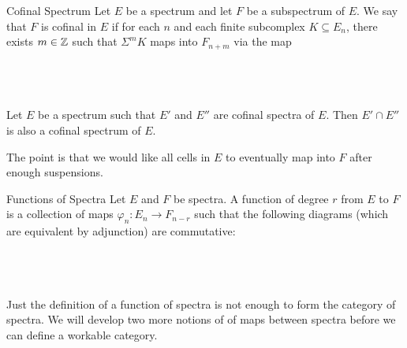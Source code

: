 \documentclass[a4paper]{article}
\begin{document}
\begin{defn}{Cofinal Spectrum}{} Let $E$ be a spectrum and let $F$ be a subspectrum of $E$. We say that $F$ is cofinal in $E$ if for each $n$ and each finite subcomplex $K\subseteq E_n$, there exists $m\in\mathbb{Z}$ such that $\Sigma^m K$ maps into $F_{n+m}$ via the map \\~\\
\\~\\
\end{defn}

\begin{lmm}{}{} Let $E$ be a spectrum such that $E'$ and $E''$ are cofinal spectra of $E$. Then $E'\cap E''$ is also a cofinal spectrum of $E$. 
\end{lmm}

The point is that we would like all cells in $E$ to eventually map into $F$ after enough suspensions. 

\begin{defn}{Functions of Spectra}{} Let $E$ and $F$ be spectra. A function of degree $r$ from $E$ to $F$ is a collection of maps $\varphi_n:E_n\to F_{n-r}$ such that the following diagrams (which are equivalent by adjunction) are commutative: \\~\\
\\~\\
\end{defn}

Just the definition of a function of spectra is not enough to form the category of spectra. We will develop two more notions of of maps between spectra before we can define a workable category. 
\end{document}
